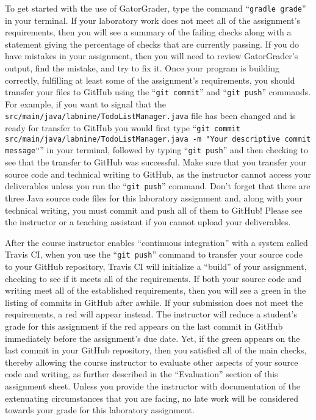 \documentclass[11pt]{article}
\newcommand{\mainprogramsource}{\lstinline{src/main/java/labnine/TodoListManager.java}}
\newcommand{\gatorgraderstart}{\command{gradle grade}}
\newcommand{\gitcommit}{\command{git commit}}
\newcommand{\gitpush}{\command{git push}}
\newcommand{\gitcommitmainprogram}{\command{git commit src/main/java/labnine/TodoListManager.java -m "Your
descriptive commit message"}}
\newcommand{\command}[1]{``\lstinline{#1}''}
\newcommand{\step}[1]{``{#1}''}
\newcommand{\checkmark}{\ding{51}}
\newcommand{\naughtmark}{\ding{55}}
\begin{document}
To get started with the use of GatorGrader, type the command \gatorgraderstart{}
in your terminal. If your laboratory work does not meet all of the assignment's
requirements, then you will see a summary of the failing checks along with a
statement giving the percentage of checks that are currently passing. If you do
have mistakes in your assignment, then you will need to review GatorGrader's
output, find the mistake, and try to fix it. Once your program is building
correctly, fulfilling at least some of the assignment's requirements, you should
transfer your files to GitHub using the \gitcommit{} and \gitpush{} commands.
For example, if you want to signal that the \mainprogramsource{} file has been
changed and is ready for transfer to GitHub you would first type
\gitcommitmainprogram{} in your terminal, followed by typing \gitpush{} and then
checking to see that the transfer to GitHub was successful. Make sure that you
transfer your source code and technical writing to GitHub, as the instructor
cannot access your deliverables unless you run the \gitpush{} command. Don't
forget that there are three Java source code files for this laboratory
assignment and, along with your technical writing, you must commit and push all
of them to GitHub! Please see the instructor or a teaching assistant if you
cannot upload your deliverables.

After the course instructor enables \step{continuous integration} with a system
called Travis CI, when you use the \gitpush{} command to transfer your source
code to your GitHub repository, Travis CI will initialize a \step{build} of your
assignment, checking to see if it meets all of the requirements. If both your
source code and writing meet all of the established requirements, then you will
see a green \checkmark{} in the listing of commits in GitHub after awhile. If
your submission does not meet the requirements, a red \naughtmark{} will appear
instead. The instructor will reduce a student's grade for this assignment if the
red \naughtmark{} appears on the last commit in GitHub immediately before the
assignment's due date. Yet, if the green \checkmark{} appears on the last commit
in your GitHub repository, then you satisfied all of the main checks, thereby
allowing the course instructor to evaluate other aspects of your source code and
writing, as further described in the \step{Evaluation} section of this
assignment sheet. Unless you provide the instructor with documentation of the
extenuating circumstances that you are facing, no late work will be considered
towards your grade for this laboratory assignment.
\end{document}

